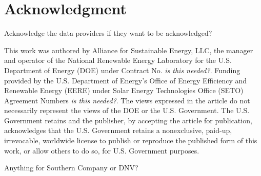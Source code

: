 \documentclass[conference]{IEEEtran}
\begin{document}
\section*{Acknowledgment}

Acknowledge the data providers if they want to be acknowledged?

This work was authored by Alliance for Sustainable Energy, LLC, the manager and operator of the National Renewable Energy Laboratory for the U.S. Department of Energy (DOE) under Contract No. \textit{\color{red}is this needed?}. Funding provided by the U.S. Department of Energy’s Office of Energy Efficiency and Renewable Energy (EERE) under Solar Energy Technologies Office (SETO) Agreement Numbers \textit{\color{red}is this needed?}. The views expressed in the article do not necessarily represent the views of the DOE or the U.S. Government. The U.S. Government retains and the publisher, by accepting the article for publication, acknowledges that the U.S. Government retains a nonexclusive, paid-up, irrevocable, worldwide license to publish or reproduce the published form of this work, or allow others to do so, for U.S. Government purposes.

Anything for Southern Company or DNV?



\end{document}
